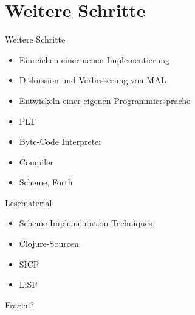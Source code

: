 \documentclass[presentation]{beamer}
\begin{document}
\section{Weitere Schritte}
\label{sec-4}

\begin{frame}[label=sec-4-1]{Weitere Schritte}
\begin{itemize}
\item Einreichen einer neuen Implementierung
\item Diskussion und Verbesserung von MAL
\item Entwickeln einer eigenen Programmiersprache
\item PLT
\item Byte-Code Interpreter
\item Compiler
\item Scheme, Forth
\end{itemize}
\end{frame}

\begin{frame}[label=sec-4-2]{Lesematerial}
\begin{itemize}
\item \href{http://www.call-with-current-continuation.org/scheme-implementation-techniques.pdf}{Scheme Implementation Techniques}
\item Clojure-Sourcen
\item SICP
\item LiSP
\end{itemize}
\end{frame}

\begin{frame}[label=sec-4-3]{Fragen?}
\end{frame}
\end{document}
